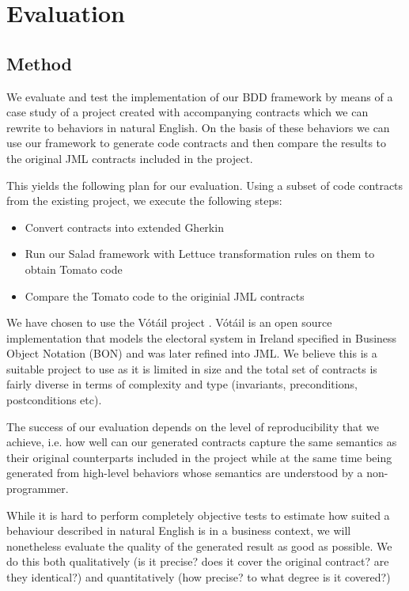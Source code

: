 \section{Evaluation}
\label{sec:Evaluation}
\subsection{Method}

We evaluate and test the implementation of our BDD framework by means of a case study of a project created with accompanying contracts which we can rewrite to behaviors in natural English. On the basis of these behaviors we can use our framework to generate code contracts and then compare the results to the original JML contracts included in the project.
 
This yields the following plan for our evaluation. Using a subset of code contracts from the existing project, we execute the following steps:

\begin{itemize}
	\item Convert contracts into extended Gherkin
	\item Run our Salad framework with Lettuce transformation rules on them to obtain Tomato code
	\item Compare the Tomato code to the originial JML contracts
\end{itemize}

We have chosen to use the V\'{o}t\'{a}il project \cite{votailCochranKiniry}. V\'{o}t\'{a}il is an open source implementation that models the electoral system in Ireland specified in Business Object Notation (BON) \cite{bonmethod} and was later refined into JML. We believe this is a suitable project to use as it is limited in size and the total set of contracts is fairly diverse in terms of complexity and type (invariants, preconditions, postconditions etc).

The success of our evaluation depends on the level of reproducibility that we achieve, i.e. how well can our generated contracts capture the same semantics as their original counterparts included in the project while at the same time being generated from high-level behaviors whose semantics are understood by a non-programmer.
 
While it is hard to perform completely objective tests to estimate how suited a behaviour described in natural English is in a business context, we will nonetheless evaluate the quality of the generated result as good as possible. We do this both qualitatively (is it precise? does it cover the original contract? are they identical?) and quantitatively (how precise? to what degree is it covered?)
 
